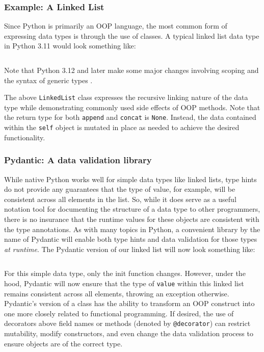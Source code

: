 \documentclass{article}
\begin{document}
\subsubsection{Example: A Linked List}

Since Python is primarily an OOP language, the most common form of expressing data types is through the use of classes.
A typical linked list data type in Python 3.11 would look something like:
\inputminted{python}{linked_list/main.py}
Note that Python 3.12 and later make some major changes involving scoping and the syntax of generic types \cite{pythonGenericTypeChange}.

The above \texttt{LinkedList} class expresses the recursive linking nature of the data type while demonstrating
commonly used side effects of OOP methods. Note that the return type for both \texttt{append} and \texttt{concat}
is \texttt{None}. Instead, the data contained within the \texttt{self} object is mutated in place as needed to achieve
the desired functionality.

\subsubsection{Pydantic: A data validation library}

While native Python works well for simple data types like linked lists, type hints do not provide any guarantees
that the type of value, for example, will be consistent across all elements in the list. So, while it does serve as a useful
notation tool for documenting the structure of a data type to other programmers, there is no insurance that the runtime
values for these objects are consistent with the type annotations. As with many topics in Python, a convenient library by the name
of Pydantic will enable both type hints and data validation for those types \textit{at runtime}. The Pydantic version
of our linked list will now look something like:
\inputminted{python}{linked_list/main_pydantic.py}

For this simple data type, only the init function changes. However, under the hood, Pydantic will now ensure that
the type of \texttt{value} within this linked list remains consistent across all elements, throwing an exception
otherwise. Pydantic's version of a class has the ability to transform an OOP construct into one more closely related
to functional programming. If desired, the use of decorators above field names or methods (denoted by \texttt{@decorator})
can restrict mutability, modify constructors, and even change the data validation process to ensure objects are of the correct type.
\end{document}

